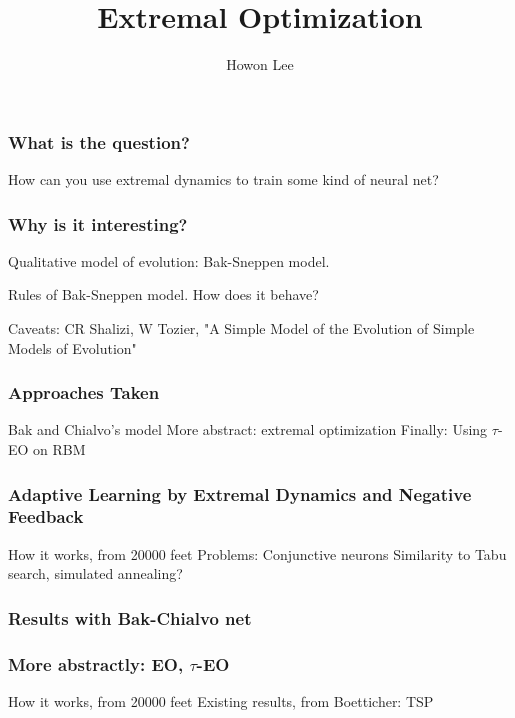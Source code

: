 \documentclass{beamer}
\begin{document}
\title{Extremal Optimization}
\author{Howon Lee}
\maketitle

\begin{frame}
  \frametitle{What is the question?}
  How can you use extremal dynamics to train some kind of neural net?
\end{frame}

\begin{frame}
  \frametitle{Why is it interesting?}
  Qualitative model of evolution: Bak-Sneppen model.

  Rules of Bak-Sneppen model. How does it behave?

  Caveats: CR Shalizi, W Tozier, "A Simple Model of the Evolution of Simple Models of Evolution"
\end{frame}

\begin{frame}
  \frametitle{Approaches Taken}
  Bak and Chialvo's model
  More abstract: extremal optimization
  Finally: Using $\tau$-EO on RBM
\end{frame}

\begin{frame}
  \frametitle{Adaptive Learning by Extremal Dynamics and Negative Feedback}
  How it works, from 20000 feet
  Problems: Conjunctive neurons
  Similarity to Tabu search, simulated annealing?
\end{frame}

\begin{frame}
  \frametitle{Results with Bak-Chialvo net}
\end{frame}

\begin{frame}
  \frametitle{More abstractly: EO, $\tau$-EO}
  How it works, from 20000 feet
  Existing results, from Boetticher: TSP
\end{frame}
\end{document}
